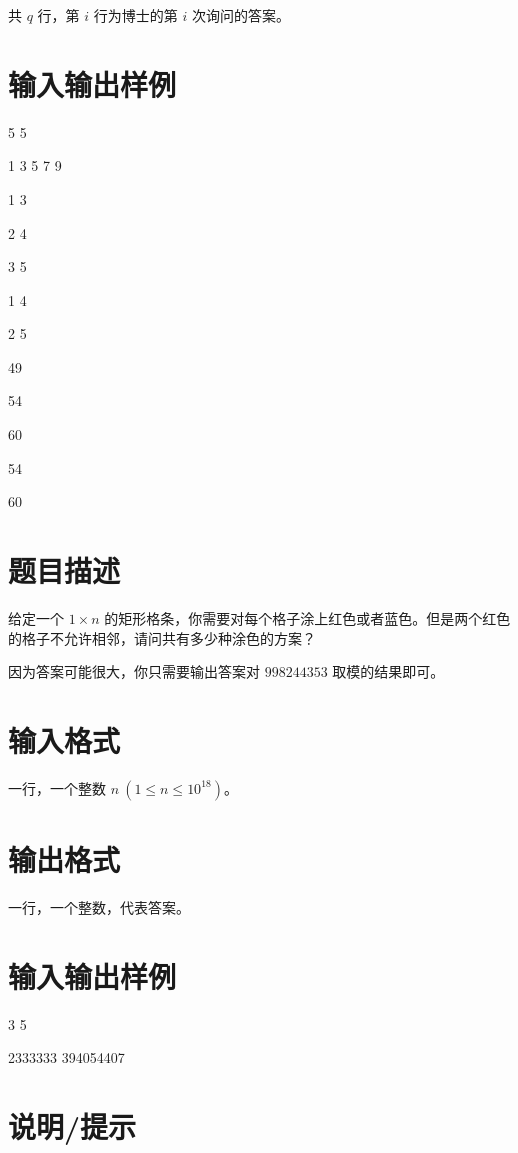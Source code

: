 \documentclass{../cpct/ctpro}
\begin{document}
共 $q$ 行，第 $i$ 行为博士的第 $i$ 次询问的答案。

\section*{输入输出样例}

\testcasetab
{
    5 5\par
    1 3 5 7 9\par
    1 3\par
    2 4\par
    3 5\par
    1 4\par
    2 5
}
{
    49\par
    54\par
    60\par
    54\par
    60\par
}

\makeproblem
\section*{题目描述}

给定一个 $1 \times n$ 的矩形格条，你需要对每个格子涂上红色或者蓝色。但是两个红色的格子不允许相邻，请问共有多少种涂色的方案？

因为答案可能很大，你只需要输出答案对 $998244353$ 取模的结果即可。

\section*{输入格式}

一行，一个整数 $n~(1 \leq n \leq {10}^{18})$。

\section*{输出格式}

一行，一个整数，代表答案。

\section*{输入输出样例}

\testcasetab
{
    3
}
{
    5
}

\testcasetab
{
    2333333
}
{
    394054407
}

\section*{说明/提示}
\end{document}
